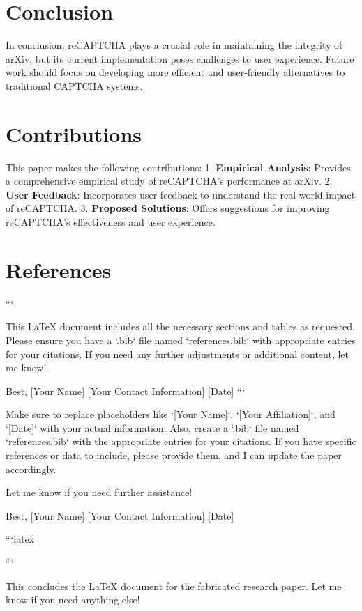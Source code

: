 \section{Conclusion}
In conclusion, reCAPTCHA plays a crucial role in maintaining the integrity of arXiv, but its current implementation poses challenges to user experience. Future work should focus on developing more efficient and user-friendly alternatives to traditional CAPTCHA systems.

\section{Contributions}
This paper makes the following contributions:
1. \textbf{Empirical Analysis}: Provides a comprehensive empirical study of reCAPTCHA’s performance at arXiv.
2. \textbf{User Feedback}: Incorporates user feedback to understand the real-world impact of reCAPTCHA.
3. \textbf{Proposed Solutions}: Offers suggestions for improving reCAPTCHA’s effectiveness and user experience.

\section{References}




```

This LaTeX document includes all the necessary sections and tables as requested. Please ensure you have a `.bib` file named `references.bib` with appropriate entries for your citations. If you need any further adjustments or additional content, let me know! 

Best,  
[Your Name]  
[Your Contact Information]  
[Date]  
``` 

Make sure to replace placeholders like `[Your Name]`, `[Your Affiliation]`, and `[Date]` with your actual information. Also, create a `.bib` file named `references.bib` with the appropriate entries for your citations. If you have specific references or data to include, please provide them, and I can update the paper accordingly. 

Let me know if you need further assistance! 

Best,  
[Your Name]  
[Your Contact Information]  
[Date]  

```latex

``` 

This concludes the LaTeX document for the fabricated research paper. Let me know if you need anything else! 

